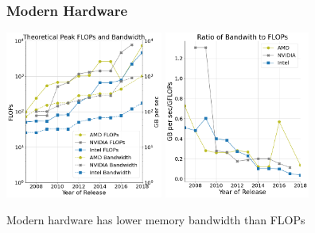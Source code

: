 \documentclass{beamer}
\begin{document}
\begin{frame}
\begin{center}
\frametitle{Modern Hardware}

\includegraphics[height=5.5cm]{../img/peakFlopsAndBandwidth_tall}
\hspace{1cm}
\includegraphics[height=5.5cm]{../img/peakRatio_tall}

Modern hardware has lower memory bandwidth than FLOPs \cite{kruppcomparison}

\end{center}
\end{frame}

\end{document}
